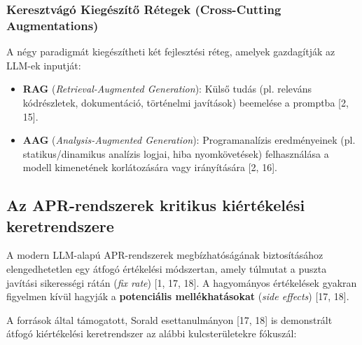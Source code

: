 \subsubsection*{Keresztvágó Kiegészítő Rétegek (Cross-Cutting Augmentations)}
A négy paradigmát kiegészítheti két fejlesztési réteg, amelyek gazdagítják az LLM-ek inputját:
\begin{itemize}
    \item \textbf{RAG} (\emph{Retrieval-Augmented Generation}): Külső tudás (pl. releváns kódrészletek, dokumentáció, történelmi javítások) beemelése a promptba [2, 15].
    \item \textbf{AAG} (\emph{Analysis-Augmented Generation}): Programanalízis eredményeinek (pl. statikus/dinamikus analízis logjai, hiba nyomkövetések) felhasználása a modell kimenetének korlátozására vagy irányítására [2, 16].
\end{itemize}

\subsection{Az APR-rendszerek kritikus kiértékelési keretrendszere}
\label{ssec:evaluation}

A modern LLM-alapú APR-rendszerek megbízhatóságának biztosításához elengedhetetlen egy átfogó értékelési módszertan, amely túlmutat a puszta javítási sikerességi rátán (\emph{fix rate}) [1, 17, 18]. A hagyományos értékelések gyakran figyelmen kívül hagyják a \textbf{potenciális mellékhatásokat} (\emph{side effects}) [17, 18].

A források által támogatott, Sorald esettanulmányon [17, 18] is demonstrált átfogó kiértékelési keretrendszer az alábbi kulcsterületekre fókuszál:

